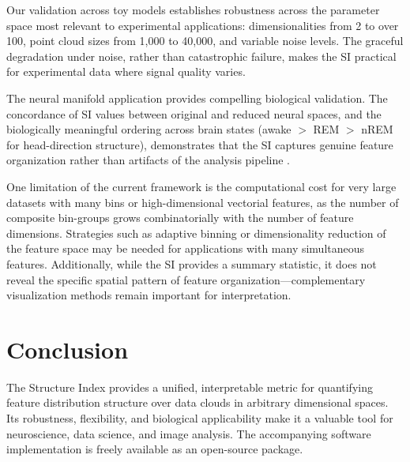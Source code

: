 \documentclass[12pt]{article}
\begin{document}
Our validation across toy models establishes robustness across the parameter space most relevant to experimental applications: dimensionalities from 2 to over 100, point cloud sizes from 1,000 to 40,000, and variable noise levels. The graceful degradation under noise, rather than catastrophic failure, makes the SI practical for experimental data where signal quality varies.

The neural manifold application provides compelling biological validation. The concordance of SI values between original and reduced neural spaces, and the biologically meaningful ordering across brain states (awake $>$ REM $>$ nREM for head-direction structure), demonstrates that the SI captures genuine feature organization rather than artifacts of the analysis pipeline \citep{peyrache2015internally,chaudhuri2019intrinsic}.

One limitation of the current framework is the computational cost for very large datasets with many bins or high-dimensional vectorial features, as the number of composite bin-groups grows combinatorially with the number of feature dimensions. Strategies such as adaptive binning or dimensionality reduction of the feature space may be needed for applications with many simultaneous features. Additionally, while the SI provides a summary statistic, it does not reveal the specific spatial pattern of feature organization---complementary visualization methods remain important for interpretation.

\section{Conclusion}

The Structure Index provides a unified, interpretable metric for quantifying feature distribution structure over data clouds in arbitrary dimensional spaces. Its robustness, flexibility, and biological applicability make it a valuable tool for neuroscience, data science, and image analysis. The accompanying software implementation is freely available as an open-source package.



\end{document}
